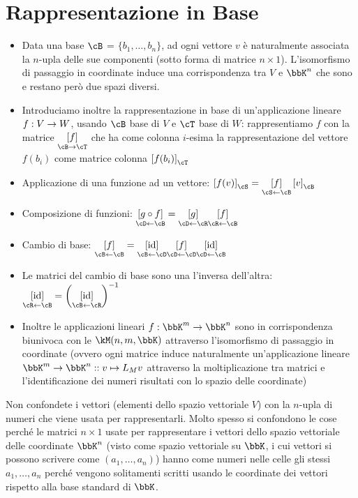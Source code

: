 \documentclass[a4paper,NoNotes,GeneralMath]{stdmdoc}
\newcommand{\mtrvec}[2]{\left[ {#1} \right]_{#2}}
\newcommand{\mtrapp}[3]{\underset{ {{#2} \rar {#3}} }{ \left[ {#1} \right]}}
\newcommand{\revmtrapp}[3]{\underset{ {{#3} \leftarrow {#2}} }{ \left[ {#1} \right]}}
\begin{document}
	\section*{Rappresentazione in Base}
	\begin{itemize}
		\item Data una base $\cB$ = $\{b_1, \ldots, b_n\}$, ad ogni vettore $v$ è naturalmente associata la $n$-upla delle sue componenti (sotto forma di matrice $n\times 1$). L'isomorfismo di passaggio in coordinate induce una corrispondenza tra $V$ e $\bbK^n$ che sono e restano però due spazi diversi. \\ \hsystem{\mtrvec{v}{\cB}: V \rar \kM(n, 1, \bbK)}{v = \sum_{i} a_i b_i \quad \mapsto \quad \left( \begin{array}{c} a_1 \\ \vdots \\ a_n \end{array} \right)_{\cB}}
		\item Introduciamo inoltre la rappresentazione in base di un'applicazione lineare $f: V \rightarrow W$, usando $\cB$ base di $V$ e $\cT$ base di $W$: rappresentiamo $f$ con la matrice $\mtrapp{f}{\cB}{\cT}$ che ha come colonna $i$-esima la rappresentazione del vettore $f(b_i)$ come matrice colonna $\mtrvec{f(b_i)}{\cT}$
		\item Applicazione di una funzione ad un vettore: $\mtrvec{f(v)}{\cS} = \revmtrapp{f}{\cB}{\cS} \mtrvec{v}{\cB}$
		\item Composizione di funzioni: $\revmtrapp{g\circ f}{\cB}{\cD} = \revmtrapp{g}{\cR}{\cD} \revmtrapp{f}{\cB}{\cR}$
		\item Cambio di base: $\revmtrapp{f}{\cB}{\cB} = \revmtrapp{\Id}{\cD}{\cB} \revmtrapp{f}{\cD}{\cD} \revmtrapp{\Id}{\cB}{\cD}$
		\item Le matrici del cambio di base sono una l'inversa dell'altra: $\revmtrapp{\Id}{\cB}{\cR} = \left(\revmtrapp{\Id}{\cR}{\cB}\right) ^ {-1}$
		\item Inoltre le applicazioni lineari $f: \bbK^m \rar \bbK^n$ sono in corrispondenza biunivoca con le $\kM(n, m, \bbK)$ attraverso l'isomorfismo di passaggio in coordinate (ovvero ogni matrice induce naturalmente un'applicazione lineare $\bbK^m \rar \bbK^n :: v \mapsto L_M v$ attraverso la moltiplicazione tra matrici e l'identificazione dei numeri risultati con lo spazio delle coordinate)
	\end{itemize}
	\Achtung Non confondete i vettori (elementi dello spazio vettoriale $V$) con la $n$-upla di numeri che viene usata per rappresentarli. Molto spesso si confondono le cose perché le matrici $n\times 1$ usate per rappresentare i vettori dello spazio vettoriale delle coordinate $\bbK^n$ (visto come spazio vettoriale su $\bbK$, i cui vettori si possono scrivere come $(a_1, \ldots, a_n)$) hanno come numeri nelle celle gli stessi $a_1, \ldots, a_n$ perché vengono solitamenti scritti usando le coordinate dei vettori rispetto alla base standard di $\bbK$.
\end{document}
